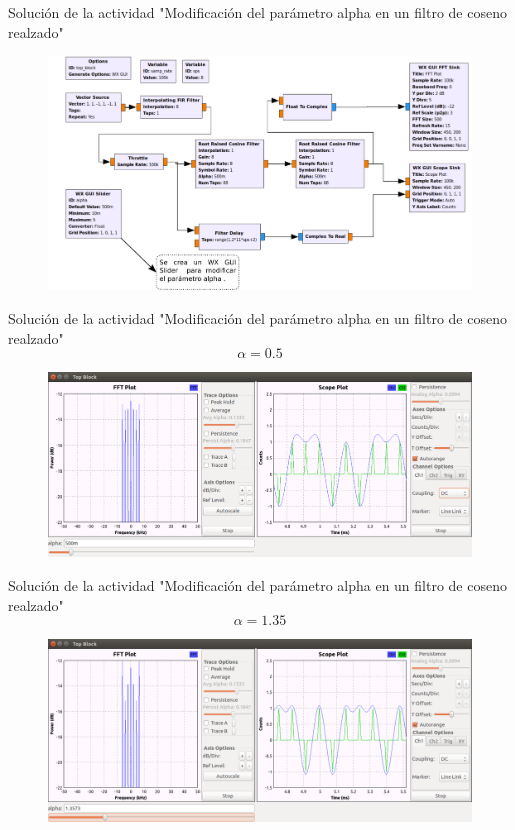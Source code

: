 \begin{frame}{Solución de la actividad "Modificación del parámetro alpha en un filtro de coseno realzado"}
\begin{figure}
\includegraphics[width=.9\textwidth]{soluciones/actividad-5-1/pdf/lab5_7.pdf}
\end{figure}
\end{frame}
\begin{frame}{Solución de la actividad "Modificación del parámetro alpha en un filtro de coseno realzado"}
$$\alpha=0.5$$
\begin{figure}
\includegraphics[width=1.05\textwidth]{soluciones/actividad-5-1/pdf/lab5_8.pdf}
\end{figure}
\end{frame}
\begin{frame}{Solución de la actividad "Modificación del parámetro alpha en un filtro de coseno realzado"}
$$\alpha=1.35$$
\begin{figure}
\includegraphics[width=1.05\textwidth]{soluciones/actividad-5-1/pdf/lab5_9.pdf}
\end{figure}
\end{frame}
